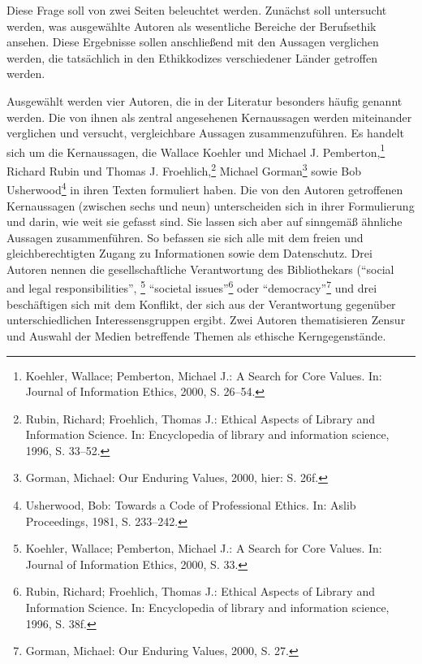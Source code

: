 \documentclass[output=paper]{langscibook}
\begin{document}
Diese Frage soll von zwei Seiten beleuchtet werden. Zunächst soll
untersucht werden, was ausgewählte Autoren als wesentliche Bereiche der
Berufsethik ansehen. Diese Ergebnisse sollen anschließend mit den
Aussagen verglichen werden, die tatsächlich in den Ethikkodizes
verschiedener Länder getroffen werden.

Ausgewählt werden vier Autoren, die in der Literatur besonders häufig
genannt werden. Die von ihnen als zentral angesehenen Kernaussagen
werden miteinander verglichen und versucht, vergleichbare Aussagen
zusammenzuführen. Es handelt sich um die Kernaussagen, die Wallace
Koehler und Michael J. Pemberton,\footnote{Koehler, Wallace; Pemberton,
  Michael J.: A Search for Core Values. In: Journal of Information
  Ethics, 2000, S. 26--54.} Richard Rubin und Thomas J.
Froehlich,\footnote{Rubin, Richard; Froehlich, Thomas J.: Ethical
  Aspects of Library and Information Science. In: Encyclopedia of
  library and information science, 1996, S. 33--52.} Michael
Gorman\footnote{Gorman, Michael: Our Enduring Values, 2000, hier: S.
  26f.} sowie Bob Usherwood\footnote{Usherwood, Bob: Towards a Code of
  Professional Ethics. In: Aslib Proceedings, 1981, S. 233--242.} in
ihren Texten formuliert haben. Die von den Autoren getroffenen
Kernaussagen (zwischen sechs und neun) unterscheiden sich in ihrer
Formulierung und darin, wie weit sie gefasst sind. Sie lassen sich aber
auf sinngemäß ähnliche Aussagen zusammenführen. So befassen sie sich
alle mit dem freien und gleichberechtigten Zugang zu Informationen sowie
dem Datenschutz. Drei Autoren nennen die gesellschaftliche Verantwortung
des Bibliothekars (\enquote{social and legal responsibilities},
\footnote{Koehler, Wallace; Pemberton, Michael J.: A Search for Core
  Values. In: Journal of Information Ethics, 2000, S. 33.}
\enquote{societal issues}\footnote{Rubin, Richard; Froehlich, Thomas J.:
  Ethical Aspects of Library and Information Science. In: Encyclopedia
  of library and information science, 1996, S. 38f.} oder
\enquote{democracy}\footnote{Gorman, Michael: Our Enduring Values, 2000,
  S. 27.} und drei beschäftigen sich mit dem Konflikt, der sich aus der
Verantwortung gegenüber unterschiedlichen Interessensgruppen ergibt.
Zwei Autoren thematisieren Zensur und Auswahl der Medien betreffende
Themen als ethische Kerngegenstände.

\end{document}
